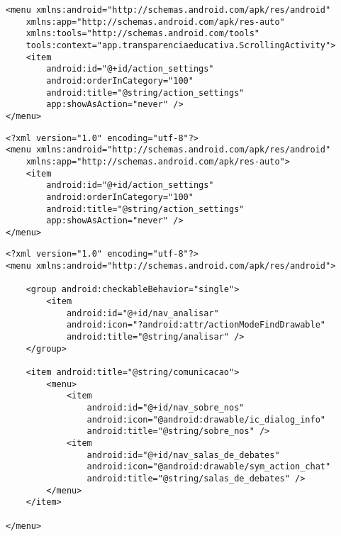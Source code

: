 \documentclass[12pt,a4paper]{article}
\begin{document}
\begin{lstlisting}[caption=./mobile/src/main/res/menu/menu\_scrolling.xml]
<menu xmlns:android="http://schemas.android.com/apk/res/android"
    xmlns:app="http://schemas.android.com/apk/res-auto"
    xmlns:tools="http://schemas.android.com/tools"
    tools:context="app.transparenciaeducativa.ScrollingActivity">
    <item
        android:id="@+id/action_settings"
        android:orderInCategory="100"
        android:title="@string/action_settings"
        app:showAsAction="never" />
</menu>
\end{lstlisting}
\pagebreak

\begin{lstlisting}[caption=./mobile/src/main/res/menu/main.xml]
<?xml version="1.0" encoding="utf-8"?>
<menu xmlns:android="http://schemas.android.com/apk/res/android"
    xmlns:app="http://schemas.android.com/apk/res-auto">
    <item
        android:id="@+id/action_settings"
        android:orderInCategory="100"
        android:title="@string/action_settings"
        app:showAsAction="never" />
</menu>
\end{lstlisting}
\pagebreak

\begin{lstlisting}[caption=./mobile/src/main/res/menu/activity\_main\_drawer.xml]
<?xml version="1.0" encoding="utf-8"?>
<menu xmlns:android="http://schemas.android.com/apk/res/android">

    <group android:checkableBehavior="single">
        <item
            android:id="@+id/nav_analisar"
            android:icon="?android:attr/actionModeFindDrawable"
            android:title="@string/analisar" />
    </group>

    <item android:title="@string/comunicacao">
        <menu>
            <item
                android:id="@+id/nav_sobre_nos"
                android:icon="@android:drawable/ic_dialog_info"
                android:title="@string/sobre_nos" />
            <item
                android:id="@+id/nav_salas_de_debates"
                android:icon="@android:drawable/sym_action_chat"
                android:title="@string/salas_de_debates" />
        </menu>
    </item>

</menu>
\end{lstlisting}
\pagebreak
\end{document}
